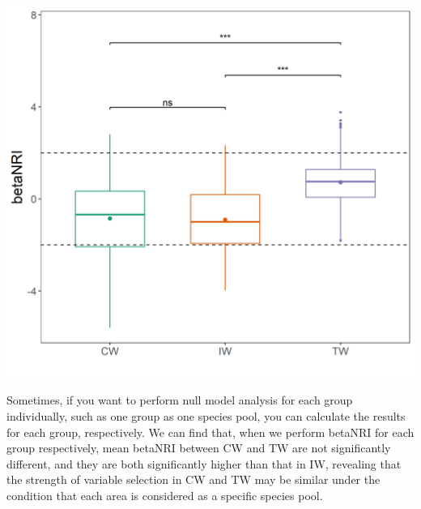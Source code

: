 \documentclass[
]{book}
\begin{document}
\begin{center}\includegraphics[width=550px]{Images/plot_betaNRI_one_dataset} \end{center}

Sometimes, if you want to perform null model analysis for each group individually, such as one group as one species pool,
you can calculate the results for each group, respectively.
We can find that, when we perform betaNRI for each group respectively,
mean betaNRI between CW and TW are not significantly different, and they are both significantly higher than that in IW,
revealing that the strength of variable selection in CW and TW may be similar under the condition that each area is considered as a specific species pool.
\end{document}

